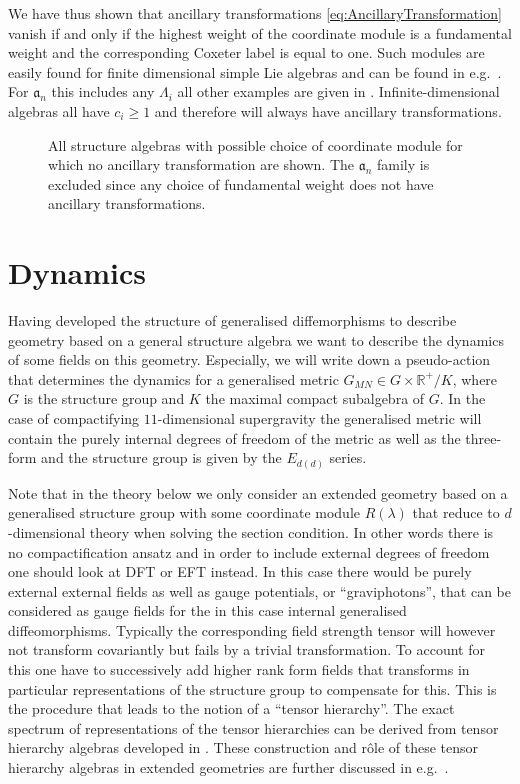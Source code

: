 We have thus shown that ancillary transformations \eqref{eq:AncillaryTransformation} vanish if and only if the highest weight of the coordinate module is a fundamental weight and the corresponding Coxeter label is equal to one. Such modules are easily found for finite dimensional simple Lie algebras and can be found in e.g.\ \cite{Fuchs1997}. For $\mathfrak{a}_n$ this includes any $\Lambda_i$ all other examples are given in . Infinite-dimensional algebras all have $c_i\geq 1$ and therefore will always have ancillary transformations. 

\begin{figure}
    \centering
    \DynkinNoAncillary{}
    \caption{All structure algebras with possible choice of coordinate module for which no ancillary transformation are shown. The $\mathfrak{a}_n$ family is excluded since any choice of fundamental weight does not have ancillary transformations.}
    \label{fig:DynkinNoAncillary}
\end{figure}


\section{Dynamics\label{sec:Dynamics}}
Having developed the structure of generalised diffemorphisms to describe geometry based on a general structure algebra we want to describe the dynamics of some fields on this geometry. Especially, we will write down a pseudo-action that determines the dynamics for a generalised metric $G_{MN}\in G\times \mathbb{R}^+/K$, where $G$ is the structure group and $K$ the maximal compact subalgebra of $G$. In the case of compactifying $11$-dimensional supergravity the generalised metric will contain the purely internal degrees of freedom of the metric as well as the three-form and the structure group is given by the $E_{d(d)}$ series. 

Note that in the theory below we only consider an extended geometry based on a generalised structure group with some coordinate module $R(\lambda)$ that reduce to $d$-dimensional theory when solving the section condition. In other words there is no compactification ansatz and in order to include external degrees of freedom one should look at DFT or EFT instead. In this case there would be purely external external fields as well as gauge potentials, or ``graviphotons'', that can be considered as gauge fields for the in this case internal generalised diffeomorphisms. Typically the corresponding field strength tensor will however not transform covariantly but fails by a trivial transformation. To account for this one have to successively add higher rank form fields that transforms in particular representations of the structure group to compensate for this. This is the procedure that  leads to the notion of a ``tensor hierarchy''. The exact spectrum of representations of the tensor hierarchies can be derived from tensor hierarchy algebras developed in \cite{Palmkvist:2013vya}. These construction and rôle of these tensor hierarchy algebras in extended geometries are further discussed in e.g.\ \cite{Carbone:2018njd,Cederwall:2018aab}.

